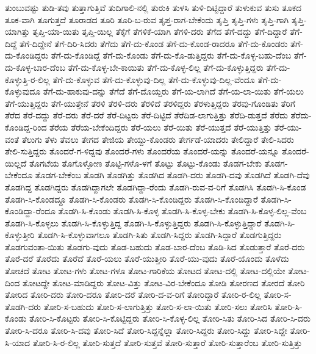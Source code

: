 {ತುಂಬುವಷ್ಟು
ತುಡಿ-ತವು
ತುತ್ತಾಗುತ್ತಿವೆ
ತುದಿಗಾಲಿ-ನಲ್ಲಿ
ತುರುಕಿ
ತುಳಸಿ
ತುಳಿ-ದಿಟ್ಟಿದ್ದಾರೆ
ತುಳುಕುವ
ತುಸು
ತೂಕದ
ತೂಕ-ವಾಗಿ
ತೂಗುತ್ತದೆ
ತೂರಾಡದ
ತೂರಿ
ತೂರಿ-ಬ-ರುವ
ತೃಪ್ತ-ರಾಗ-ಬೇಕೆಂದು
ತೃಪ್ತಿ
ತೃಪ್ತಿ-ಗಳು
ತೃಪ್ತಿ-ಗಾಗಿ
ತೃಪ್ತಿ-ಯಾಗಿತ್ತು
ತೃಪ್ತಿ-ಯಾ-ಯಿತು
ತೃಪ್ತಿ-ಯಿಲ್ಲ
ತೆಕ್ಕೆಗೆ
ತೆಗಳಿಕೆ-ಯಾಗಿ
ತೆಗಳಿ-ದರು
ತೆಗೆದ
ತೆಗೆ-ದದ್ದು
ತೆಗೆ-ದಿದ್ದಾರೆ
ತೆಗೆ-ದಿದ್ದೆ
ತೆಗೆ-ದಿದ್ದೇನೆ
ತೆಗೆ-ದಿರಿ-ಸಿದರು
ತೆಗೆದು
ತೆಗೆ-ದು-ಕೊಂಡ
ತೆಗೆ-ದು-ಕೊಂಡ-ರಾದರೂ
ತೆಗೆ-ದು-ಕೊಂಡರು
ತೆಗೆ-ದು-ಕೊಂಡಿದ್ದರು
ತೆಗೆ-ದು-ಕೊಂಡಿದ್ದೆ
ತೆಗೆ-ದು-ಕೊಂಡು
ತೆಗೆ-ದು-ಕೊ-ಡುತ್ತಿದ್ದರು
ತೆಗೆ-ದು-ಕೊಳ್ಳ-ಬಹು-ದೆಂಬ
ತೆಗೆ-ದು-ಕೊಳ್ಳ-ಬಾರ-ದೆಂಬ
ತೆಗೆ-ದು-ಕೊಳ್ಳ-ಬೇ-ಕಾಯಿತು
ತೆಗೆ-ದು-ಕೊಳ್ಳ-ಲಿಲ್ಲ
ತೆಗೆ-ದು-ಕೊಳ್ಳುತ್ತಿದ್ದರು
ತೆಗೆ-ದು-ಕೊಳ್ಳುತ್ತಿ-ರ-ಲಿಲ್ಲ
ತೆಗೆ-ದು-ಕೊಳ್ಳುವ
ತೆಗೆ-ದು-ಕೊಳ್ಳುವು-ದಿಲ್ಲ
ತೆಗೆ-ದು-ಕೊಳ್ಳುವು-ದಿಲ್ಲ-ವೆಂದೂ
ತೆಗೆ-ದು-ಕೊಳ್ಳುವುದೂ
ತೆಗೆ-ದು-ಹಾಕುವು-ದನ್ನು
ತೆಗೆದೆ
ತೆಗೆ-ದೊಯ್ದರು
ತೆಗೆ-ಯ-ಲಾಗಿದೆ
ತೆಗೆ-ಯ-ಲಾ-ಯಿತು
ತೆಗೆ-ಯಲು
ತೆಗೆ-ಯುತ್ತಿದ್ದರು
ತೆಗೆ-ಯುತ್ತೇನೆ
ತೆರಳಿ
ತೆರಳಿ-ದರು
ತೆರಳಿದೆ
ತೆರಳಿದ್ದರು
ತೆರಳುತ್ತಿದ್ದರು
ತೆರವು-ಗೊಂಡಿತು
ತೆರಿಗೆ
ತೆರೆದ
ತೆರೆ-ದದ್ದು
ತೆರೆ-ದರು
ತೆರೆ-ದರೆ
ತೆರೆ-ದಿಟ್ಟರು
ತೆರೆ-ದಿಟ್ಟಿದೆ
ತೆರೆದಿಡ-ಲಾಗುತ್ತಿತ್ತು
ತೆರೆದಿ-ಡುತ್ತದೆ
ತೆರೆದು
ತೆರೆದು-ಕೊಂಡಿದ್ದ-ರಿಂದ
ತೆರೆಯ
ತೆರೆಯ-ಬೇಕೆಂದಿದ್ದರು
ತೆರೆ-ಯಲು
ತೆರೆ-ಯಿತು
ತೆರೆ-ಯುತ್ತದೆ
ತೆರೆ-ಯುತ್ತಿತ್ತು
ತೆರೆ-ಯು-ವಂತೆ
ತೆಲುಗು
ತೆಳು
ತೆವಲು
ತೇಗದ
ತೇಜಿಯ
ತೇಯ್ದು-ಕೊಂಡರು
ತೇರ್ಗಡೆ-ಯಾದರು
ತೇಲಿದ್ದಾರೆ
ತೇಲಿ-ಸಿದರು
ತೇಲಿ-ಸುತ್ತಿದ್ದರು
ತೊಂದರೆ-ಗ-ಳಿದ್ದವು
ತೊಂದರೆ-ಗಳು
ತೊಂದರೆಯ
ತೊಂದರೆ-ಯನ್ನು
ತೊಂದರೆ-ಯನ್ನೂ
ತೊಂದರೆ-ಯಿಲ್ಲದೆ
ತೊಗಟೆಯ
ತೊಗೊಳ್ಳೋಣ
ತೊಟ್ಟಿ-ಗಳೊ-ಳಗೆ
ತೊಟ್ಟು
ತೊಟ್ಟು-ಕೊಂಡು
ತೊಡಗ-ಬೇಕು
ತೊಡಗ-ಬೇಕೆಂದೂ
ತೊಡಗ-ಬೇಕೆಂಬ
ತೊಡಗಿ
ತೊಡಗಿತ್ತು
ತೊಡಗಿದ
ತೊಡಗಿ-ದರು
ತೊಡಗಿ-ದವು
ತೊಡಗಿದೆ
ತೊಡಗಿ-ದೆವು
ತೊಡಗಿದ್ದ
ತೊಡಗಿದ್ದರು
ತೊಡಗಿದ್ದಾಗಲೇ
ತೊಡಗಿದ್ದಾ-ರೆಂದು
ತೊಡಗಿ-ರುವ-ವ-ರಿಗೆ
ತೊಡಗಿಸಿ
ತೊಡಗಿ-ಸಿ-ಕೊಂಡ
ತೊಡಗಿ-ಸಿ-ಕೊಂಡದ್ದೂ
ತೊಡಗಿ-ಸಿ-ಕೊಂಡರು
ತೊಡಗಿ-ಸಿ-ಕೊಂಡಿದ್ದರು
ತೊಡಗಿ-ಸಿ-ಕೊಂಡಿದ್ದಾರೆ
ತೊಡಗಿ-ಸಿ-ಕೊಂಡಿದ್ದಾ-ರೆಂದೂ
ತೊಡಗಿ-ಸಿ-ಕೊಂಡು
ತೊಡಗಿ-ಸಿ-ಕೊಳ್ಳ
ತೊಡಗಿ-ಸಿ-ಕೊಳ್ಳ-ಬೇಕು
ತೊಡಗಿ-ಸಿ-ಕೊಳ್ಳ-ಲಿಲ್ಲ-ವೆಂಬ
ತೊಡಗಿ-ಸಿ-ಕೊಳ್ಳಲು
ತೊಡಗಿ-ಸಿ-ಕೊಳ್ಳುತ್ತಿದ್ದ
ತೊಡಗಿ-ಸಿ-ಕೊಳ್ಳುತ್ತಿದ್ದರು
ತೊಡಗಿ-ಸಿ-ಕೊಳ್ಳುತ್ತಿದ್ದಾರೆ
ತೊಡಗಿ-ಸಿ-ಕೊಳ್ಳುತ್ತೀರಿ
ತೊಡಗಿ-ಸಿ-ಕೊಳ್ಳುವಾಗಲೂ
ತೊಡಗಿ-ಸಿತು
ತೊಡಗಿ-ಸಿದ್ದರು
ತೊಡಗಿ-ಸಿದ್ದಾರೆ
ತೊಡಗುತ್ತಿದ್ದರು
ತೊಡಗುವಂತಾ-ಯಿತು
ತೊಡಗು-ವುದು
ತೊಡ-ಬಹುದು
ತೊಡ-ಬಾರ-ದೆಂಬ
ತೊಡಿ-ಸಿದ
ತೊಡುತ್ತಾರೆ
ತೊರೆ-ದರು
ತೊರೆ-ದರೆ
ತೊರೆದು
ತೊರೆದೆ
ತೊರೆ-ಯಲು
ತೊರೆ-ಯುತ್ತೀರಿ
ತೊರೆ-ಯು-ವುದು
ತೊರೆ-ಯೊಂದು
ತೊಳೆದು
ತೋಚದೆ
ತೋಟ
ತೋಟ-ಗಳು
ತೋಟ-ಗಳೂ
ತೋಟ-ಗಾರಿಕೆಯ
ತೋಟದ
ತೋಟ-ದಲ್ಲಿ
ತೋಟ-ದಲ್ಲಿಯೇ
ತೋಟ-ದಿಂದ
ತೋಟದ್ದೇ
ತೋಟ-ಮಾಡಿದ್ದರು
ತೋಟ-ವಿತ್ತು
ತೋಟ-ವಿರ-ಬೇಕೆಂದೂ
ತೋಡಿ
ತೋರಣದ
ತೋರದೆ
ತೋರಿ
ತೋರಿದ
ತೋರಿ-ದರು
ತೋರಿ-ದರೂ
ತೋರಿ-ದರೆ
ತೋರಿ-ದ-ವ-ರಿಗೆ
ತೋರಿದ್ದಾರೆ
ತೋರಿ-ರ-ಲಿಲ್ಲ
ತೋರಿ-ಸ-ತೊಡಗಿ-ದರು
ತೋರಿ-ಸ-ಬಹುದು
ತೋರಿ-ಸ-ಲಾಗುತ್ತಿತ್ತು
ತೋರಿ-ಸ-ಲಾ-ಯಿತು
ತೋರಿ-ಸಲು
ತೋರಿಸಿ
ತೋರಿ-ಸಿ-ಕೊಂಡು
ತೋರಿ-ಸಿ-ಕೊಟ್ಟರು
ತೋರಿ-ಸಿ-ಕೊಟ್ಟಿದ್ದರು
ತೋರಿ-ಸಿ-ಕೊಳ್ಳ-ಲಿಲ್ಲ
ತೋರಿ-ಸಿತು
ತೋರಿ-ಸಿದ
ತೋರಿ-ಸಿ-ದರು
ತೋರಿ-ಸಿ-ದರೂ
ತೋರಿ-ಸಿ-ದವು
ತೋರಿ-ಸಿದೆ
ತೋರಿ-ಸಿದ್ದನ್ನೆಲ್ಲಾ
ತೋರಿ-ಸಿದ್ದರು
ತೋರಿ-ಸಿದ್ದು
ತೋರಿ-ಸಿದ್ದೇ
ತೋರಿ-ಸಿ-ಯಾದ
ತೋರಿ-ಸಿ-ರ-ಲಿಲ್ಲ
ತೋರಿ-ಸುತ್ತದೆ
ತೋರಿ-ಸುತ್ತವೆ
ತೋರಿ-ಸುತ್ತಾರೆ
ತೋರಿ-ಸುತ್ತಾರೆಂಬ
ತೋರಿ-ಸುತ್ತಿತ್ತು
}
